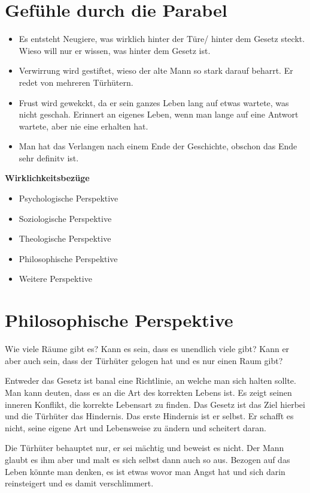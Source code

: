 \documentclass{article}
\begin{document}
\section{Gefühle durch die Parabel}
\begin{itemize}[parsep=0pt]
    \item Es entsteht Neugiere, was wirklich hinter der Türe/ hinter dem Gesetz steckt. Wieso will nur er wissen, was hinter dem Gesetz ist.
    \item Verwirrung wird gestiftet, wieso der alte Mann so stark darauf beharrt. Er redet von mehreren Türhütern.
    \item Frust wird gewekckt, da er sein ganzes Leben lang auf etwas wartete, was nicht geschah. Erinnert an eigenes Leben, wenn man lange auf eine Antwort wartete, aber nie eine erhalten hat.
    \item Man hat das Verlangen nach einem Ende der Geschichte, obschon das Ende sehr definitv ist.
\end{itemize}

\textbf{Wirklichkeitsbezüge}

\begin{itemize}
    \item Psychologische Perspektive
    \item Soziologische Perspektive
    \item Theologische Perspektive
    \item Philosophische Perspektive
    \item Weitere Perspektive
\end{itemize}

\section{Philosophische Perspektive}
Wie viele Räume gibt es? Kann es sein, dass es unendlich viele gibt? Kann er aber auch sein, dass der Türhüter gelogen hat und es nur einen Raum gibt?

Entweder das Gesetz ist banal eine Richtlinie, an welche man sich halten sollte. Man kann deuten, dass es an die Art des korrekten Lebens ist.
Es zeigt seinen inneren Konflikt, die korrekte Lebensart zu finden. Das Gesetz ist das Ziel hierbei und die Türhüter das Hindernis.
Das erste Hindernis ist er selbst. Er schafft es nicht, seine eigene Art und Lebensweise zu ändern und scheitert daran.

Die Türhüter behauptet nur, er sei mächtig und beweist es nicht. Der Mann glaubt es ihm aber und malt es sich selbst dann auch so aus.
Bezogen auf das Leben könnte man denken, es ist etwas wovor man Angst hat und sich darin reinsteigert und es damit verschlimmert.
\end{document}
